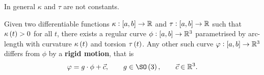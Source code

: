 In general $ \kappa $ and $ \tau $ are not constants.


\begin{theorem}
Given two differentiable functions $ \kappa : \sbr{a, b} \to \RR $ and $ \tau : \sbr{a, b} \to \RR $ such that $ \kappa\br{t} > 0 $ for all $ t $, there exists a regular curve $ \phi : \sbr{a, b} \to \RR^3 $ parametrised by arc-length with curvature $ \kappa\br{t} $ and torsion $ \tau\br{t} $. Any other such curve $ \varphi : \sbr{a, b} \to \RR^3 $ differs from $ \phi $ by a \textbf{rigid motion}, that is
$$ \varphi = g \cdot \phi + \vec{c}, \qquad g \in \SO\br{3}, \qquad \vec{c} \in \RR^3. $$
\end{theorem}

